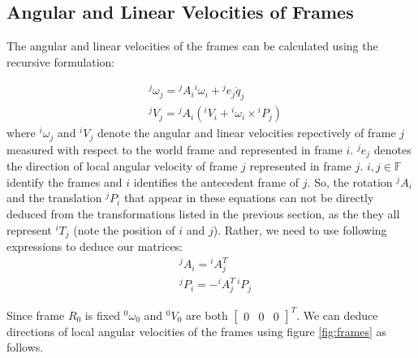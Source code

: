 \documentclass[a4paper,10pt]{article}
\begin{document}
\subsection{Angular and Linear Velocities of Frames}
The angular and linear velocities of the frames can be calculated using the recursive formulation:

\begin{align}
 &{}^j\omega_j={}^jA_i{}^i\omega_i+{}^je_j\dot{q}_j \\
 &{}^jV_j={}^jA_i\left({}^iV_i+{}^i\omega_i \times {}^iP_j\right)
\end{align} where ${}^i\omega_j$ and ${}^iV_j$ denote the angular and linear velocities repectively of frame $j$ measured with respect to the 
world frame and represented in frame $i$. ${}^je_j$ denotes the direction of local angular velocity of frame $j$ represented in frame $j$. 
$i, j \in \mathbb{F}$ identify the frames and $i$ identifies the antecedent frame of $j$. So, the rotation ${}^jA_i$ and the 
translation ${}^jP_i$ that appear in these equations can not be directly deduced from the transformations listed in the previous section, 
as the they all represent ${}^iT_j$ (note the position of $i$ and $j$). Rather, we need to use following expressions to deduce our matrices:
\begin{align}
 &{}^jA_i = {}^iA_j^T \nonumber \\ 
 &{}^jP_i = -{}^iA_j^T\,{}^iP_j \nonumber
\end{align}

Since frame $R_0$ is fixed ${}^0\omega_0$ and ${}^0V_0$ are both $\left[\begin{matrix}0 & 0 & 0\end{matrix}\right]^T$. We can deduce directions of 
local angular velocities of the frames using figure \ref{fig:frames} as follows.
\end{document}
